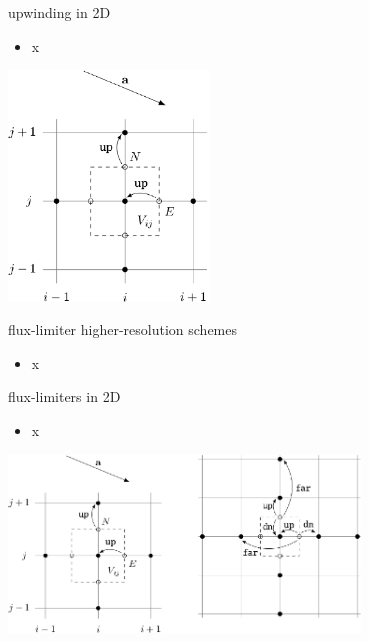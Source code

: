 \documentclass[10pt,hyperref,dvipsnames]{beamer}
\begin{document}
\begin{frame}{upwinding in 2D}

\begin{itemize}
\item x
\end{itemize}

\hfill \includegraphics[width=0.4\textwidth]{figs/bueler11p8upwind}
\end{frame}


\begin{frame}{flux-limiter higher-resolution schemes}

\begin{itemize}
\item x
\end{itemize}
\end{frame}


\begin{frame}{flux-limiters in 2D}

\begin{itemize}
\item x
\end{itemize}

\begin{center}
\includegraphics[width=0.7\textwidth]{figs/bueler11p8}
\end{center}
\end{frame}
\end{document}
